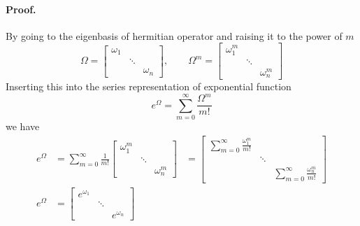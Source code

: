 \documentclass[../../../main.tex]{subfiles}
\begin{document}
\paragraph*{Proof.}
By going to the eigenbasis of hermitian operator and raising it to the power of $m$
\begin{equation*}
	\Omega=
	\begin{bmatrix}
		\omega_1 &        &          \\
		         & \ddots &          \\
		         &        & \omega_n
	\end{bmatrix},
	\qquad
	\Omega^m=
	\begin{bmatrix}
		\omega_1^m &        &            \\
		           & \ddots &            \\
		           &        & \omega_n^m
	\end{bmatrix}
\end{equation*}
Inserting this into the series representation of exponential function
\begin{equation*}
	e^\Omega=\sum_{m=0}^{\infty}\frac{\Omega^m}{m!}
\end{equation*}
we have
\begin{align*}
	e^\Omega & =\sum_{m=0}^{\infty}\frac{1}{m!}
	\begin{bmatrix}
		\omega_1^m &        &            \\
		           & \ddots &            \\
		           &        & \omega_n^m
	\end{bmatrix}
	         & =
	\begin{bmatrix}
		\sum_{m=0}^{\infty}\frac{\omega_1^m }{m!} &        &                                          \\
		                                          & \ddots &                                          \\
		                                          &        & \sum_{m=0}^{\infty}\frac{\omega_n^m}{m!}
	\end{bmatrix} \\
	e^\Omega & =
	\begin{bmatrix}
		e^{\omega_1} &        &              \\
		             & \ddots &              \\
		             &        & e^{\omega_n}
	\end{bmatrix}
\end{align*}
\end{document}
